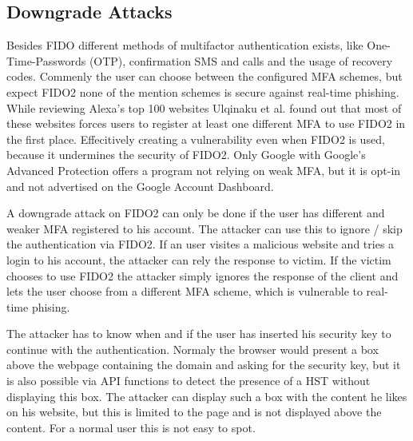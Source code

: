 \documentclass[runningheads]{llncs}
\begin{document}
\subsection{Downgrade Attacks}
Besides FIDO different methods of multifactor authentication exists, like One-Time-Passwords (OTP), confirmation SMS and calls and the usage of recovery codes. Commenly the user can choose between the configured MFA schemes, but expect FIDO2 none of the mention schemes is secure against real-time phishing. While reviewing Alexa's top 100 websites Ulqinaku et al. found out that most of these websites forces users to register at least one different MFA to use FIDO2 in the first place. Effecitively creating a vulnerability even when FIDO2 is used, because it undermines the security of FIDO2. Only Google with Google's Advanced Protection offers a program not relying on weak MFA, but it is opt-in and not advertised on the Google Account Dashboard.

A downgrade attack on FIDO2 can only be done if the user has different and weaker MFA registered to his account. The attacker can use this to ignore / skip the authentication via FIDO2. If an user visites a malicious website and tries a login to his account, the attacker can rely the response to victim. If the victim chooses to use FIDO2 the attacker simply ignores the response of the client and lets the user choose from a different MFA scheme, which is vulnerable to real-time phising.

The attacker has to know when and if the user has inserted his security key to continue with the authentication. Normaly the browser would present a box above the webpage containing the domain and asking for the security key, but it is also possible via API functions to detect the presence of a HST without displaying this box. The attacker can display such a box with the content he likes on his website, but this is limited to the page and is not displayed above the content. For a normal user this is not easy to spot.\cite{274610}
\end{document}
